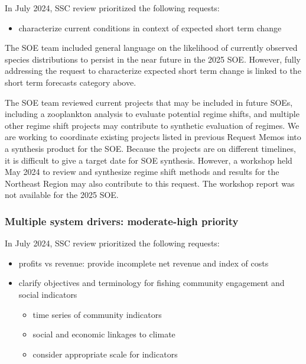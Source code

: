 \documentclass[
  10pt,
]{article}
\providecommand{\tightlist}{%
  \setlength{\itemsep}{0pt}\setlength{\parskip}{0pt}}
\begin{document}
In July 2024, SSC review prioritized the following requests:

\begin{itemize}
\tightlist
\item
  characterize current conditions in context of expected short term
  change
\end{itemize}

The SOE team included general language on the likelihood of currently
observed species distributions to persist in the near future in the 2025
SOE. However, fully addressing the request to characterize expected
short term change is linked to the short term forecasts category above.

The SOE team reviewed current projects that may be included in future
SOEs, including a zooplankton analysis to evaluate potential regime
shifts, and multiple other regime shift projects may contribute to
synthetic evaluation of regimes. We are working to coordinate existing
projects listed in previous Request Memos into a synthesis product for
the SOE. Because the projects are on different timelines, it is
difficult to give a target date for SOE synthesis. However, a workshop
held May 2024 to review and synthesize regime shift methods and results
for the Northeast Region may also contribute to this request. The
workshop report was not available for the 2025 SOE.

\hypertarget{multiple-system-drivers-moderate-high-priority}{%
\subsubsection{Multiple system drivers: moderate-high
priority}\label{multiple-system-drivers-moderate-high-priority}}

In July 2024, SSC review prioritized the following requests:

\begin{itemize}
\tightlist
\item
  profits vs revenue: provide incomplete net revenue and index of costs
\item
  clarify objectives and terminology for fishing community engagement
  and social indicators

  \begin{itemize}
  \tightlist
  \item
    time series of community indicators
  \item
    social and economic linkages to climate
  \item
    consider appropriate scale for indicators
  \end{itemize}
\end{itemize}
\end{document}
